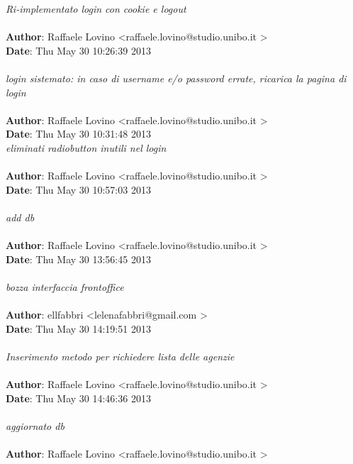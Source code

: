 \documentclass[a4paper,12pt]{article} %
\begin{document}
    \emph{Ri-implementato login con cookie e logout}\\
\\
\textbf{Author}: Raffaele Lovino \textless raffaele.lovino@studio.unibo.it \textgreater \\
\textbf{Date}:   Thu May 30 10:26:39 2013 \\
\\
    \emph{login sistemato: in caso di username e/o password errate, ricarica la pagina di login}\\
\\
\textbf{Author}: Raffaele Lovino \textless raffaele.lovino@studio.unibo.it \textgreater \\
\textbf{Date}:   Thu May 30 10:31:48 2013 \\

    \emph{eliminati radiobutton inutili nel login}\\
\\
\textbf{Author}: Raffaele Lovino \textless raffaele.lovino@studio.unibo.it \textgreater \\
\textbf{Date}:   Thu May 30 10:57:03 2013 \\
\\
    \emph{add db}\\
\\
\textbf{Author}: Raffaele Lovino \textless raffaele.lovino@studio.unibo.it \textgreater \\
\textbf{Date}:   Thu May 30 13:56:45 2013 \\
\\
    \emph{bozza interfaccia frontoffice}\\
\\
\textbf{Author}: ellfabbri \textless lelenafabbri@gmail.com \textgreater \\
\textbf{Date}:   Thu May 30 14:19:51 2013 \\
\\
    \emph{Inserimento metodo per richiedere lista delle agenzie}\\
\\
\textbf{Author}: Raffaele Lovino \textless raffaele.lovino@studio.unibo.it \textgreater \\
\textbf{Date}:   Thu May 30 14:46:36 2013 \\
\\
    \emph{aggiornato db}\\
\\
\textbf{Author}: Raffaele Lovino \textless raffaele.lovino@studio.unibo.it \textgreater \\
\end{document}
